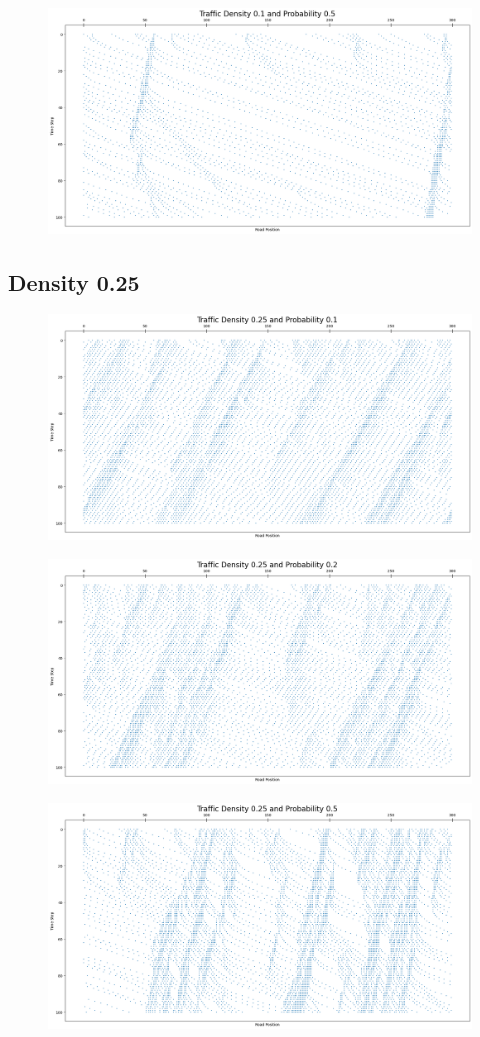 \documentclass{article}
\begin{document}
\begin{figure}[!h]
    \centering
    \includegraphics[width=0.70\linewidth]{assets/d0.1p0.5.png}
\end{figure}

\newpage
\subsection{Density 0.25}
\begin{figure}[!h]
    \centering
    \includegraphics[width=0.70\linewidth]{assets/d0.25p0.1.png}
\end{figure}

\begin{figure}[!h]
    \centering
    \includegraphics[width=0.70\linewidth]{assets/d0.25p0.2.png}
\end{figure}

\begin{figure}[!h]
    \centering
    \includegraphics[width=0.70\linewidth]{assets/d0.25p0.5.png}
\end{figure}
\end{document}
